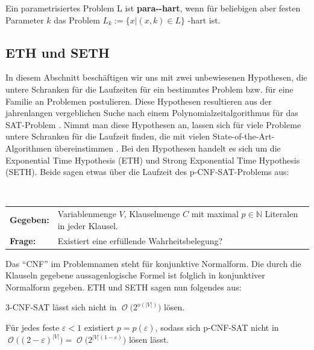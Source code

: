 \documentclass[a4paper,ngerman]{atseminar}
\newcommand{\N}{\ensuremath{\mathbb{N}}\xspace}
\newcommand{\BigO}[1]{\ensuremath{\operatorname{\mathcal{O}}\bigl(#1\bigr)}\xspace}
\begin{document}
\begin{definition}
  Ein parametrisiertes Problem L ist \textbf{para-\NP-hart}, wenn für beliebigen aber festen Parameter $k$ das Problem
  $L_k := \{x | (x, k) \in L\}$ \NP-hart ist.
\end{definition}


\subsection{ETH und SETH}

In diesem Abschnitt beschäftigen wir uns mit zwei unbewiesenen Hypothesen, die untere Schranken für die Laufzeiten für ein bestimmtes Problem bzw. für eine
Familie an Problemen postulieren.
Diese Hypothesen resultieren aus der jahrenlangen vergeblichen Suche nach einem Polynomialzeitalgorithmus für das SAT-Problem \cite{Parameterized, Beyond}.
Nimmt man diese Hypothesen an, lassen sich für viele Probleme untere Schranken für die Laufzeit finden, die mit vielen State-of-the-Art-Algorithmen übereinstimmen \cite{Parameterized, Beyond}.
\noindent
Bei den Hypothesen handelt es sich um die Exponential Time Hypothesis (ETH) und Strong Exponential Time Hypothesis (SETH). Beide sagen etwas über die
Laufzeit des p-\textsc{CNF-SAT}-Problems aus:

\begin{definition}
  $ $\newline
  \begin{tabular}{ll}
    \textbf{Gegeben:} & Variablenmenge $V$, Klauselmenge $C$ mit maximal $p \in \N$ Literalen in jeder Klausel. \\
    \textbf{Frage:} & Existiert eine erfüllende Wahrheitsbelegung?
  \end{tabular}
\end{definition}

\noindent
Das \enquote{CNF} im Problemnamen steht für konjunktive Normalform. Die durch die Klauseln gegebene aussagenlogische Formel ist folglich in konjunktiver Normalform gegeben.
ETH und SETH sagen nun folgendes aus:

\begin{definition}
  \label{oe:definition:eth}
  3-\textsc{CNF-SAT} lässt sich nicht in \BigO{2^{o(|V|)}} lösen.
\end{definition}

\begin{definition}
  Für jedes feste $\varepsilon < 1$ existiert $p = p(\varepsilon)$, sodass sich p-\textsc{CNF-SAT} nicht in $\BigO{(2 - \varepsilon)^{|V|}} = \BigO{2^{|V|(1 - \varepsilon)}}$ lösen lässt.
\end{definition}
  
\end{document}
